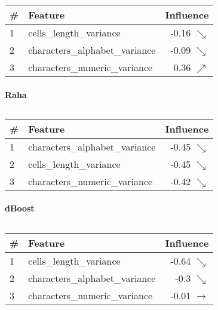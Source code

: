 \begin{table}[H]
\centering
\begin{tabular}{llr}
\toprule
 \# &                         Feature &         Influence \\
\midrule
 1 &         cells\_length\_variance &  -0.16 $\searrow$ \\
 2 &  characters\_alphabet\_variance &  -0.09 $\searrow$ \\
 3 &   characters\_numeric\_variance &   0.36 $\nearrow$ \\
\bottomrule
\end{tabular}
\caption{}
\end{table}


\paragraph{Raha}

\begin{table}[H]
\centering
\begin{tabular}{llr}
\toprule
 \# &                         Feature &         Influence \\
\midrule
 1 &  characters\_alphabet\_variance &  -0.45 $\searrow$ \\
 2 &         cells\_length\_variance &  -0.45 $\searrow$ \\
 3 &   characters\_numeric\_variance &  -0.42 $\searrow$ \\
\bottomrule
\end{tabular}
\caption{}
\end{table}

\paragraph{dBoost}

\begin{table}[H]
\centering
\begin{tabular}{llr}
\toprule
 \# &                         Feature &            Influence \\
\midrule
 1 &         cells\_length\_variance &     -0.64 $\searrow$ \\
 2 &  characters\_alphabet\_variance &      -0.3 $\searrow$ \\
 3 &   characters\_numeric\_variance &  -0.01 $\rightarrow$ \\
\bottomrule
\end{tabular}
\caption{}
\end{table}